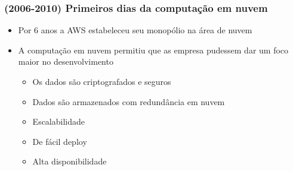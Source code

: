 \begin{frame}[allowframebreaks]
	\frametitle{(2006-2010) Primeiros dias da computação em nuvem}
	\begin{itemize}
		\item Por 6 anos a AWS estabeleceu seu monopólio na área de nuvem
		\item A computação em nuvem permitiu que as empresa pudessem dar um foco maior no desenvolvimento
			\begin{itemize}
				\item Os dados são criptografados e seguros
				\item Dados são armazenados com redundância em nuvem
				\item Escalabilidade
				\item De fácil deploy
				\item Alta disponibilidade
			\end{itemize}
	\end{itemize}
\end{frame}


